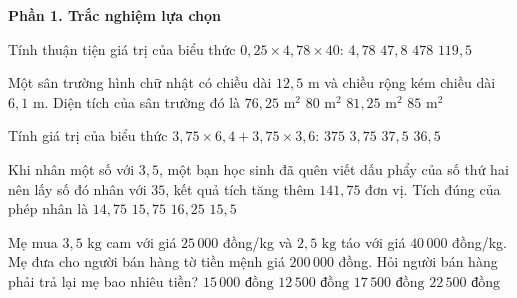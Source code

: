 \textbf{Phần 1. Trắc nghiệm lựa chọn}

\begin{ex} %
Tính thuận tiện giá trị của biểu thức $0{,}25 \times 4{,}78 \times 40$:
\choice
{$4{,}78$}
{\True $47{,}8$}
{$478$}
{$119{,}5$}
\end{ex}

\begin{ex} %
Một sân trường hình chữ nhật có chiều dài $12{,}5\text{ m}$ và chiều rộng kém chiều dài $6{,}1\text{ m}$. Diện tích của sân trường đó là
\choice
{$76{,}25\text{ m}^2$}
{\True $80\text{ m}^2$}
{$81{,}25\text{ m}^2$}
{$85\text{ m}^2$}
\end{ex}

\begin{ex} %
Tính giá trị của biểu thức $3{,}75 \times 6{,}4 + 3{,}75 \times 3{,}6$:
\choice
{$375$}
{$3{,}75$}
{\True $37{,}5$}
{$36{,}5$}
\end{ex}

\begin{ex} %
Khi nhân một số với $3{,}5$, một bạn học sinh đã quên viết dấu phẩy của số thứ hai nên lấy số đó nhân với $35$, kết quả tích tăng thêm $141{,}75$ đơn vị. Tích đúng của phép nhân là
\choice
{$14{,}75$}
{\True $15{,}75$}
{$16{,}25$}
{$15{,}5$}
\end{ex}

\begin{ex} %
Mẹ mua $3{,}5\text{ kg}$ cam với giá $25\,000$ đồng/kg và $2{,}5\text{ kg}$ táo với giá $40\,000$ đồng/kg. Mẹ đưa cho người bán hàng tờ tiền mệnh giá $200\,000$ đồng. Hỏi người bán hàng phải trả lại mẹ bao nhiêu tiền?
\choice
{$15\,000\text{ đồng}$}
{\True $12\,500\text{ đồng}$}
{$17\,500\text{ đồng}$}
{$22\,500\text{ đồng}$}
\end{ex}

